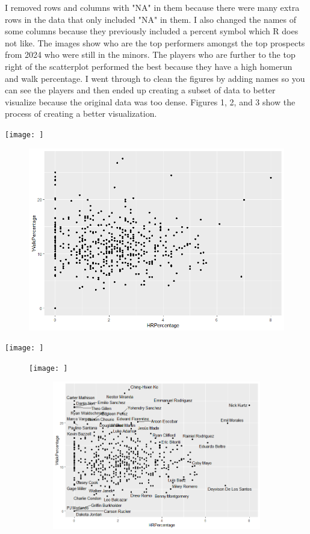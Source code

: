 \documentclass{article}
\begin{document}
I removed rows and columns with "NA" in them because there were many extra rows in the data that only included "NA" in them. I also changed the names of some columns because they previously included a percent symbol which R does not like. The images show who are the top performers amongst the top prospects from 2024 who were still in the minors. The players who are further to the top right of the scatterplot performed the best because they have a high homerun and walk percentage. I went through to clean the figures by adding names so you can see the players and then ended up creating a subset of data to better visualize because the original data was too dense. Figures 1, 2, and 3 show the process of creating a better visualization.

\texttt{[image: ]}
\begin{figure}
    \centering
    \includegraphics[width=0.5\linewidth]{PS6a_Matthies.png}
    \caption{}
    \label{fig:enter-label}
\end{figure}

\vspace{1.5cm}


\texttt{[image: ]}
\begin{figure}
    \centering
    \texttt{[image: ]}
\begin{figure}
        \centering
        \includegraphics[width=0.5\linewidth]{PS6b_Matthies.png}
        \caption{}
        \label{fig:enter-label}
    \end{figure}
        \caption{}
    \label{fig:enter-label}
\end{figure}
\end{document}
